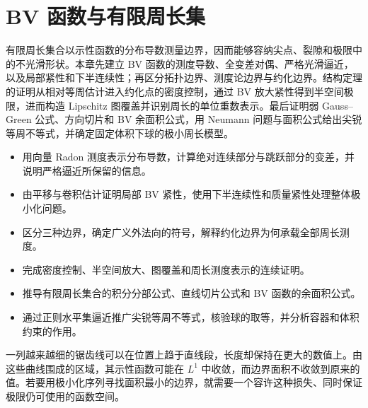 
% 
% 

\chapter{BV 函数与有限周长集}
\label{g3:ch:21}

\begin{chapterabstract}
	有限周长集合以示性函数的分布导数测量边界，因而能够容纳尖点、裂隙和极限中的不光滑形状。本章先建立 BV 函数的测度导数、全变差对偶、严格光滑逼近，以及局部紧性和下半连续性；再区分拓扑边界、测度论边界与约化边界。结构定理的证明从相对等周估计进入约化点的密度控制，通过 BV 放大紧性得到半空间极限，进而构造 Lipschitz 图覆盖并识别周长的单位重数表示。最后证明弱 Gauss--Green 公式、方向切片和 BV 余面积公式，用 Neumann 问题与面积公式给出尖锐等周不等式，并确定固定体积下球的极小周长模型。
\end{chapterabstract}

\begin{learninggoals}
	\begin{itemize}
		\item 用向量 Radon 测度表示分布导数，计算绝对连续部分与跳跃部分的变差，并说明严格逼近所保留的信息。
		\item 由平移与卷积估计证明局部 BV 紧性，使用下半连续性和质量紧性处理整体极小化问题。
		\item 区分三种边界，确定广义外法向的符号，解释约化边界为何承载全部周长测度。
		\item 完成密度控制、半空间放大、图覆盖和周长测度表示的连续证明。
		\item 推导有限周长集合的积分分部公式、直线切片公式和 BV 函数的余面积公式。
		\item 通过正则水平集逼近推广尖锐等周不等式，核验球的取等，并分析容器和体积约束的作用。
	\end{itemize}
\end{learninggoals}

一列越来越细的锯齿线可以在位置上趋于直线段，长度却保持在更大的数值上。由这些曲线围成的区域，其示性函数可能在 \(L^1\) 中收敛，而边界面积不收敛到原来的值。若要用极小化序列寻找面积最小的边界，就需要一个容许这种损失、同时保证极限仍可使用的函数空间。

